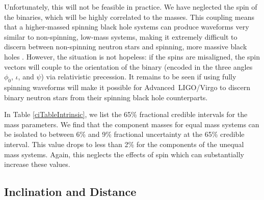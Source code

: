 \documentclass[11pt,a4paper]{emulateapj}
\begin{document}
Unfortunately, this will not be feasible in practice.  We have neglected the spin of the binaries, which will be highly
correlated to the masses.  This coupling means that a higher-massed spinning black hole systems can produce
 waveforms very similar to non-spinning, low-mass systems, making it extremely difficult to discern between non-spinning 
 neutron stars
 and spinning, more massive black holes \citep{Baird2013,Hannam2013}.  However, the situation is not hopeless: if the spins are misaligned, the spin 
 vectors will couple to the orientation of the binary (encoded in the three angles $\phi_0$, $\iota$, and $\psi$) via
 relativistic precession.  It remains to be seen if using fully spinning waveforms will make it possible for Advanced\
  LIGO/Virgo to discern binary neutron stars from their spinning black hole counterparts. 

In Table \ref{ciTableIntrinsic}, we list the 65\% fractional credible intervals for the mass parameters.  We find that the 
component masses for equal mass systems can be isolated to between 6\% and 9\% fractional uncertainty at the 65\% credible interval.  This value drops to less than 2\% for the components of the unequal mass systems.  Again, this 
neglects the effects of spin which can substantially increase these values.


\subsection{Inclination and Distance}
\label{idSection}
\end{document}
